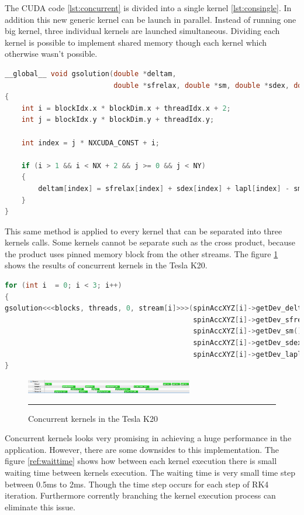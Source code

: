 The CUDA code \ref{lst:concurrent} is divided into a single kernel \ref{lst:consingle}. In addition this new generic kernel can be launch in parallel. Instead of running one big kernel, three individual kernels are launched simultaneous. Dividing each kernel is possible to implement shared memory though each kernel which otherwise wasn't possible. 

\begin{lstlisting}[language=C++, label={lst:consingle}, caption={Evaluation of individual coordinates of the Zhang and Li model}]
__global__ void gsolution(double *deltam,
					      double *sfrelax, double *sm, double *sdex, double *lapl)
{
    int i = blockIdx.x * blockDim.x + threadIdx.x + 2;
    int j = blockIdx.y * blockDim.y + threadIdx.y;
 
    int index = j * NXCUDA_CONST + i;

    if (i > 1 && i < NX + 2 && j >= 0 && j < NY)
    {
        deltam[index] = sfrelax[index] + sdex[index] + lapl[index] - sm[index];
    }
}
\end{lstlisting}

This same method is applied to every kernel that can be separated into three kernels calls. Some kernels cannot be separate such as the cross product, because the product uses pinned memory block from the other streams.  The figure \ref{fig:concurrent} shows the results of concurrent kernels in the Tesla K20.
\begin{lstlisting}[language=C++, caption={Evaluate Zhang and Li model}]
for (int i  = 0; i < 3; i++)
{
gsolution<<<blocks, threads, 0, stream[i]>>>(spinAccXYZ[i]->getDev_deltam(),
											 spinAccXYZ[i]->getDev_sfrelax(), 
											 spinAccXYZ[i]->getDev_sm(), 
											 spinAccXYZ[i]->getDev_sdex(),
											 spinAccXYZ[i]->getDev_lapl());
}
\end{lstlisting}

\begin{figure}[htbp]
	\centering
		\includegraphics[width=0.65\textwidth]{Figures/concurent.png}
		\rule{35em}{0.2pt}
	\caption[Streams kernels Tesla K20]{Concurrent kernels in the Tesla K20
}
	\label{fig:concurrent}
\end{figure}

Concurrent kernels  looks very promising in achieving a huge performance in the application. However, there are some downsides to this implementation. The figure \ref{ref:waittime} shows how between each kernel execution there is small waiting time between kernels execution. The waiting time is very small time step between 0.5ms to 2ms. Though the time step occurs for each step of RK4 iteration. Furthermore corrently branching the kernel execution process can eliminate this issue.

